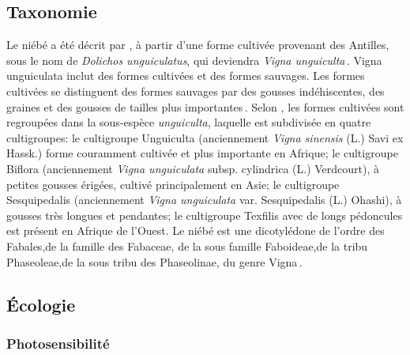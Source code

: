 \documentclass[a4paper,11pt]{article}
\begin{document}
\subsection{Taxonomie}

Le niébé a été décrit par , à partir
d'une forme cultivée provenant des Antilles, sous le nom de
\emph{Dolichos unguiculatus}, qui deviendra \emph{Vigna
  unguiculta}\,\cite{Pasquet_1997}. Vigna unguiculata inclut des
formes cultivées et des formes sauvages. Les formes cultivées se
distinguent des formes sauvages par des gousses indéhiscentes, des
graines et des gousses de tailles plus importantes\,\cite{Lush_1981}.
Selon\,\citeauthor{Vanderborght_2001}\,\citeyear{Vanderborght_2001},
les formes cultivées sont regroupées dans la sous-espèce
\emph{unguiculta}, laquelle est subdivisée en quatre cultigroupes: le
cultigroupe Unguiculta (anciennement \emph{ Vigna sinensis} (L.) Savi
ex Hassk.)  forme couramment cultivée et plus importante en Afrique;
le cultigroupe Biflora (anciennement \emph{Vigna unguiculata}
subsp. cylindrica (L.) Verdcourt), à petites gousses érigées, cultivé
principalement en Asie; le cultigroupe Sesquipedalis (anciennement
\emph{Vigna unguiculata} var. Sesquipedalis (L.) Ohashi), à gousses
très longues et pendantes; le cultigroupe Texfilis avec de longs
pédoncules est présent en Afrique de l'Ouest. Le niébé est une
dicotylédone de l'ordre des Fabales,de la famille des Fabaceae, de la
sous famille Faboideae,de la tribu Phaseoleae,de la sous tribu des
Phaseolinae, du genre Vigna\,\cite{Verdcourt_1970, Marechal_1978}.

\subsection{Écologie}

\subsubsection{Photosensibilité}
\end{document}
